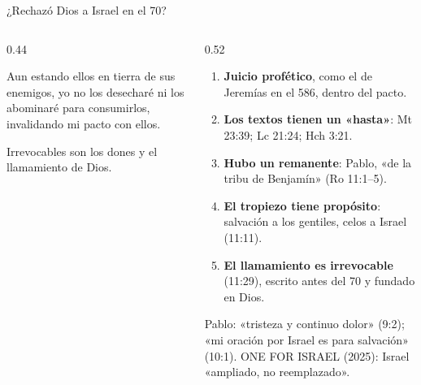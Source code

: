 \begin{frame}{¿Rechazó Dios a Israel en el 70?}
\begin{columns}[T,onlytextwidth]
\begin{column}{0.44\textwidth}
\begin{cita}Aun estando ellos en tierra de sus enemigos, yo no los desecharé ni los abominaré para consumirlos, invalidando mi pacto con ellos.\end{cita}
\begin{cita}Irrevocables son los dones y el llamamiento de Dios.\end{cita}
\end{column}
\begin{column}{0.52\textwidth}\footnotesize
\begin{enumerate}
\item \textbf{Juicio profético}, como el de Jeremías en el 586, dentro del pacto.
\item \textbf{Los textos tienen un «hasta»}: Mt 23:39; Lc 21:24; Hch 3:21.
\item \textbf{Hubo un remanente}: Pablo, «de la tribu de Benjamín» (Ro 11:1--5).
\item \textbf{El tropiezo tiene propósito}: salvación a los gentiles, celos a Israel (11:11).
\item \textbf{El llamamiento es irrevocable} (11:29), escrito antes del 70 y fundado en Dios.
\end{enumerate}
\begin{clave}Pablo: «tristeza y continuo dolor» (9:2); «mi oración por Israel es para salvación» (10:1). ONE FOR ISRAEL (2025): Israel «ampliado, no reemplazado».\end{clave}
\end{column}
\end{columns}
\end{frame}

